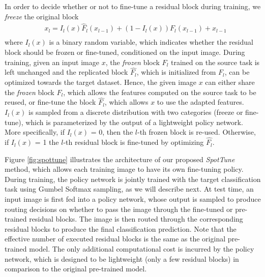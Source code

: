 \documentclass[10pt,twocolumn,letterpaper]{article}
\begin{document}
In order to decide whether or not to fine-tune a residual block during training, we \textit{freeze} the original block %
\begin{equation}
\begin{aligned}
    &x_l = I_{l}(x)\hat{F}_l(x_{l-1}) + (1-I_{l}(x))F_l(x_{l-1}) + x_{l-1}  \\
\end{aligned}
\end{equation}\noindent where $I_l(x)$ is a binary random variable, which indicates whether the residual block should be frozen or fine-tuned,  conditioned on the input image. During training, given an input image $x$, the \textit{frozen} block $F_l$ trained on the source task is left unchanged and the replicated block $\hat{F_l}$, which is initialized from $F_l$, can be optimized towards the target dataset. Hence, the given image $x$ can either share the \textit{frozen} block $F_l$, which allows the features computed on the source task to be reused, or fine-tune the block $\hat{F_l}$, which allows $x$ to use the adapted features. $I_l(x)$ is sampled from a discrete distribution with two categories (freeze or fine-tune), which is parameterized by the output of a lightweight policy network. More specifically, if $I_l(x)$ = 0, then the $l$-th frozen block is re-used. Otherwise, if $I_l(x)$ = 1 the $l$-th residual block is fine-tuned by optimizing $\hat{F_l}$.

Figure \ref{fig:spottune} illustrates the architecture of our proposed \textit{SpotTune} method, which allows each training image to have its own fine-tuning policy. During training, the policy network is jointly trained with the target classification task using Gumbel Softmax sampling, as we will describe next. At test time, an input image is first fed into a policy network, whose output is sampled to produce routing decisions on whether to pass the image through the fine-tuned or pre-trained residual blocks. The image is then routed through the corresponding residual blocks to produce the final classification prediction. Note that the effective number of executed residual blocks is the same as the original pre-trained model. The only additional computational cost is incurred by the policy network, which is designed to be lightweight (only a few residual blocks) in comparison to the original pre-trained model.
\end{document}
